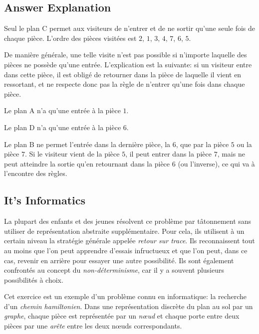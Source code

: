\documentclass[a4paper,11pt]{report}
\newcommand{\taskGraphicsFolder}{..}
\begin{document}
\endgroup

\subsection*{Answer Explanation}

Seul le plan C permet aux visiteurs de n’entrer et de ne sortir qu’une seule fois de chaque pièce. L’ordre des pièces visitées est $2$, $1$, $3$, $4$, $7$, $6$, $5$.

{\centering%
\par}

De manière générale, une telle visite n’est pas possible si n’importe laquelle des pièces ne possède qu’une entrée. L’explication est la suivante: si un visiteur entre dans cette pièce, il est obligé de retourner dans la pièce de laquelle il vient en ressortant, et ne respecte donc pas la règle de n’entrer qu’une fois dans chaque pièce.

Le plan A n’a qu’une entrée à la pièce $1$.

Le plan D n’a qu’une entrée à la pièce $6$.

Le plan B ne permet l’entrée dans la dernière pièce, la $6$, que par la pièce $5$ ou la pièce $7$. Si le visiteur vient de la pièce $5$, il peut entrer dans la pièce $7$, mais ne peut atteindre la sortie qu’en retournant dans la pièce $6$ (ou l’inverse), ce qui va à l’encontre des règles.


\subsection*{It’s Informatics}

La plupart des enfants et des jeunes résolvent ce problème par tâtonnement sans utiliser de représentation abstraite supplémentaire. Pour cela, ils utilisent à un certain niveau la stratégie générale appelée \emph{retour sur trace}. Ils reconnaissent tout au moins que l’on peut apprendre d’essais infructueux et que l’on peut, dans ce cas, revenir en arrière pour essayer une autre possibilité. Ils sont également confrontés au concept du \emph{non-déterminisme}, car il y a souvent plusieurs possibilités à choix.

Cet exercice est un exemple d’un problème connu en informatique: la recherche d’un \emph{chemin hamiltonien}. Dans une représentation discrète du plan au sol par un \emph{graphe}, chaque pièce est représentée par un \emph{nœud} et chaque porte entre deux pièces par une \emph{arête} entre les deux nœuds correspondants.
\end{document}

